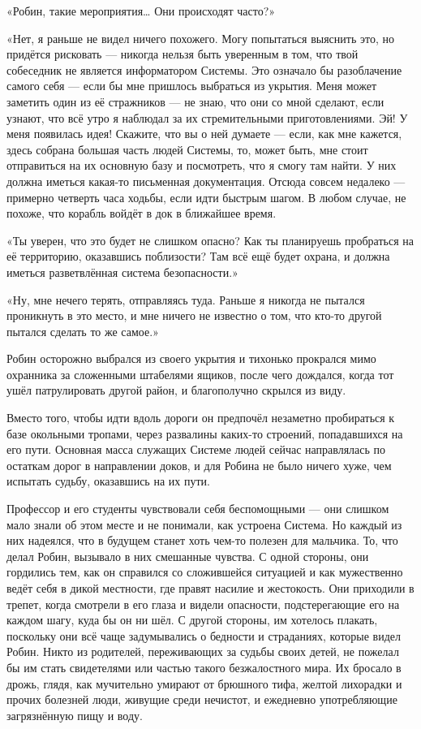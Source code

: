 \documentclass[a5paper, 9pt,
final, openany, twoside=true]{memoir}
\begin{document}
«Робин, такие мероприятия… Они происходят часто?»

«Нет, я раньше не видел ничего похожего. Могу попытаться выяснить это, но придётся рисковать — никогда нельзя быть уверенным в том, что твой собеседник не является информатором Системы. Это означало бы разоблачение самого себя — если бы мне пришлось выбраться из укрытия. Меня может заметить один из её стражников — не знаю, что они со мной сделают, если узнают, что всё утро я наблюдал за их стремительными приготовлениями. Эй! У меня появилась идея! Скажите, что вы о ней думаете — если, как мне кажется, здесь собрана большая часть людей Системы, то, может быть, мне стоит отправиться на их основную базу и посмотреть, что я смогу там найти. У них должна иметься какая-то письменная документация. Отсюда совсем недалеко — примерно четверть часа ходьбы, если идти быстрым шагом. В любом случае, не похоже, что корабль войдёт в док в ближайшее время.

«Ты уверен, что это будет не слишком опасно? Как ты планируешь пробраться на её территорию, оказавшись поблизости? Там всё ещё будет охрана, и должна иметься разветвлённая система безопасности.»

«Ну, мне нечего терять, отправляясь туда. Раньше я никогда не пытался проникнуть в это место, и мне ничего не известно о том, что кто-то другой пытался сделать то же самое.»\bigskip

Робин осторожно выбрался из своего укрытия и тихонько прокрался мимо охранника за сложенными штабелями ящиков, после чего дождался, когда тот ушёл патрулировать другой район, и благополучно скрылся из виду.

Вместо того, чтобы идти вдоль дороги он предпочёл незаметно пробираться к базе окольными тропами, через развалины каких-то строений, попадавшихся на его пути. Основная масса служащих Системе людей сейчас направлялась по остаткам дорог в направлении доков, и для Робина не было ничего хуже, чем испытать судьбу, оказавшись на их пути.

Профессор и его студенты чувствовали себя беспомощными — они слишком мало знали об этом месте и не понимали, как устроена Система. Но каждый из них надеялся, что в будущем станет хоть чем-то полезен для мальчика. То, что делал Робин, вызывало в них смешанные чувства. С одной стороны, они гордились тем, как он справился со сложившейся ситуацией и как мужественно ведёт себя в дикой местности, где правят насилие и жестокость. Они приходили в трепет, когда смотрели в его глаза и видели опасности, подстерегающие его на каждом шагу, куда бы он ни шёл. С другой стороны, им хотелось плакать, поскольку они всё чаще задумывались о бедности и страданиях, которые видел Робин. Никто из родителей, переживающих за судьбы своих детей, не пожелал бы им стать свидетелями или частью такого безжалостного мира. Их бросало в дрожь, глядя, как мучительно умирают от брюшного тифа, желтой лихорадки и прочих болезней люди, живущие среди нечистот, и ежедневно употребляющие загрязнённую пищу и воду.\bigskip
\end{document}
